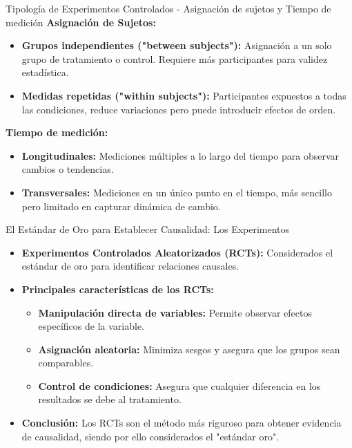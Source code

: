 ﻿\documentclass{beamer}
\begin{document}
\begin{frame}{Tipología de Experimentos Controlados - Asignación de sujetos y Tiempo de medición}
    \textbf{Asignación de Sujetos:}
    \begin{itemize}
        \item \textbf{Grupos independientes ("between subjects"):} Asignación a un solo grupo de tratamiento o control. Requiere más participantes para validez estadística.
        \item \textbf{Medidas repetidas ("within subjects"):} Participantes expuestos a todas las condiciones, reduce variaciones pero puede introducir efectos de orden.
    \end{itemize}

    \textbf{Tiempo de medición:}
    \begin{itemize}
        \item \textbf{Longitudinales:} Mediciones múltiples a lo largo del tiempo para observar cambios o tendencias.
        \item \textbf{Transversales:} Mediciones en un único punto en el tiempo, más sencillo pero limitado en capturar dinámica de cambio.
    \end{itemize}
\end{frame}


\begin{frame}{El Estándar de Oro para Establecer Causalidad: Los Experimentos}
    \begin{itemize}
        \item \textbf{Experimentos Controlados Aleatorizados (RCTs):} Considerados el estándar de oro para identificar relaciones causales.
        \item \textbf{Principales características de los RCTs:}
            \begin{itemize}
                \item \textbf{Manipulación directa de variables:} Permite observar efectos específicos de la variable.
                \item \textbf{Asignación aleatoria:} Minimiza sesgos y asegura que los grupos sean comparables.
                \item \textbf{Control de condiciones:} Asegura que cualquier diferencia en los resultados se debe al tratamiento.
            \end{itemize}
        \item \textbf{Conclusión:} Los RCTs son el método más riguroso para obtener evidencia de causalidad, siendo por ello considerados el "estándar oro".
    \end{itemize}
\end{frame}
\end{document}
